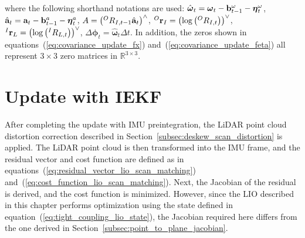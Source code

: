 %
where the following shorthand notations are used:
$\hat{ \boldsymbol \omega }_{t} = \boldsymbol \omega_{t} - {\bf b}_{t-1}^{\omega} - \boldsymbol \eta_{t}^{\omega}$,
$\hat{ {\bf a} }_{t} = {\bf a}_{t} - {\bf b}_{t-1}^{a} - \boldsymbol \eta_{t}^{a}$,
$A = \left( {}^{O}R_{I, t-1} \hat{ {\bf a} }_{t} \right)^{\wedge}$,
${}^{O}{\bf r}_{I} = \left( \log \left( {}^{O}R_{I, t} \right) \right)^{\vee}$,
${}^{I}{\bf r}_{L} = \left( \log \left( {}^{I}R_{L, t} \right) \right)^{\vee}$,
$\Delta \boldsymbol \phi_{t} = \hat{ \boldsymbol \omega }_{t} \Delta t$.
In addition, the zeros shown in equations~(\ref{eq:covariance_update_fx}) and~(\ref{eq:covariance_update_feta}) all represent $3 \times 3$ zero matrices in $\mathbb{R}^{3 \times 3}$.











\section{Update with IEKF}

After completing the update with IMU preintegration, the LiDAR point cloud distortion correction described in Section~\ref{subsec:deskew_scan_distortion} is applied.
The LiDAR point cloud is then transformed into the IMU frame, and the residual vector and cost function are defined as in equations~(\ref{eq:residual_vector_lio_scan_matching}) and~(\ref{eq:cost_function_lio_scan_matching}).
Next, the Jacobian of the residual is derived, and the cost function is minimized.
However, since the LIO described in this chapter performs optimization using the state defined in equation~(\ref{eq:tight_coupling_lio_state}), the Jacobian required here differs from the one derived in Section~\ref{subsec:point_to_plane_jacobian}.

